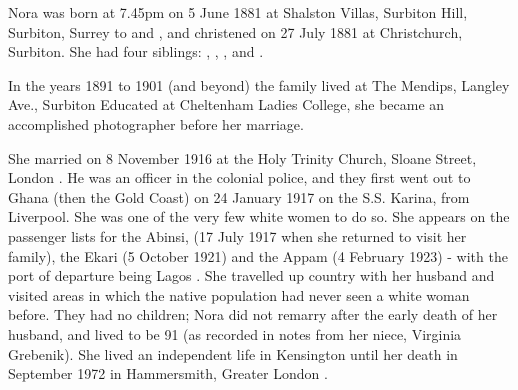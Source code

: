 
Nora was born at 7.45pm on 5 June 1881 at  Shalston Villas, Surbiton Hill,  Surbiton, Surrey to  and , and christened on 27 July 1881 at Christchurch, Surbiton.\cite{NoraMundayBirth} 	She had four siblings: , , , and .

In the years  1891 to 1901 (and beyond) the family lived at The Mendips, Langley Ave., Surbiton \cite{NoraMundayResidence}  Educated at Cheltenham Ladies College, she became an accomplished photographer before her marriage.
\cite{NoraMundayOccupation}

She married  on 8 November 1916 at the Holy Trinity Church, Sloane Street, London \cite{NoraMundayMarriage}.  He was an officer in the colonial police, and they first went out to Ghana (then the Gold Coast) on 24 January 1917 on the S.S. Karina, from Liverpool. She was one of the very few white women to do so. She appears on the passenger lists for the Abinsi, (17 July 1917 when she returned to visit her family), the Ekari (5 October 1921) and the Appam (4 February 1923) - with the port of departure being Lagos \cite{NoraMundayTravel}. She travelled up country with her husband and visited areas in which the native population had never seen a white woman before.  They had no children; Nora did not remarry after the early death of her husband, and lived to be 91 (as recorded in notes from her niece, Virginia Grebenik). She lived an independent life in Kensington until her death in September 1972 in Hammersmith, Greater London \cite{NoraMundayDeath}.
